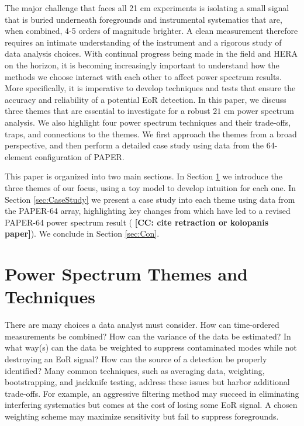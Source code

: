 \documentclass[preprint2,numberedappendix,tighten]{aastex6}  %
\newcommand{\cc}[1]{{\color{purple} \textbf{[CC: #1]}}}
\begin{document}
The major challenge that faces all 21 cm experiments is isolating a small signal that is buried underneath foregrounds and instrumental systematics that are, when combined, 4-5 orders of magnitude brighter. A clean measurement therefore requires an intimate understanding of the instrument and a rigorous study of data analysis choices. With continual progress being made in the field and HERA on the horizon, it is becoming increasingly important to understand how the methods we choose interact with each other to affect power spectrum results. More specifically, it is imperative to develop techniques and tests that ensure the accuracy and reliability of a potential EoR detection. In this paper, we discuss three themes that are essential to investigate for a robust $21$ cm power spectrum analysis. We also highlight four power spectrum techniques and their trade-offs, traps, and connections to the themes. We first approach the themes from a broad perspective, and then perform a detailed case study using data from the 64-element configuration of PAPER.

This paper is organized into two main sections. In Section \ref{sec:Themes} we introduce the three themes of our focus, using a toy model to develop intuition for each one. In Section \ref{sec:CaseStudy} we present a case study into each theme using data from the PAPER-64 array, highlighting key changes from \citet{ali_et_al2015} which have led to a revised PAPER-64 power spectrum result (\cc{cite retraction or kolopanis paper}). We conclude in Section \ref{sec:Con}.


\section{Power Spectrum Themes and Techniques}
\label{sec:Themes}

There are many choices a data analyst must consider. How can time-ordered measurements be combined? How can the variance of the data be estimated? In what way(s) can the data be weighted to suppress contaminated modes while not destroying an EoR signal? How can the source of a detection be properly identified? Many common techniques, such as averaging data, weighting, bootstrapping, and jackknife testing, address these issues but harbor additional trade-offs. For example, an aggressive filtering method may succeed in eliminating interfering systematics but comes at the cost of losing some EoR signal. A chosen weighting scheme may maximize sensitivity but fail to suppress foregrounds. 
\end{document}

